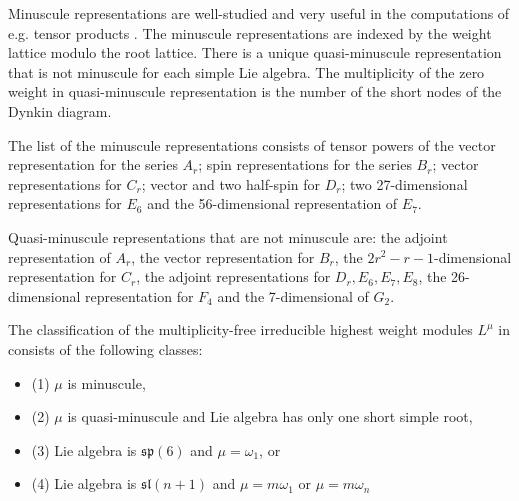 \documentclass[12pt]{iopart}
\begin{document}
Minuscule representations are well-studied and very useful in the computations of e.g. tensor products
\cite{stembridge2003multiplicity,stembridge2001computational}. The minuscule representations are
indexed by the weight lattice modulo the root lattice. There is a unique quasi-minuscule
representation that is not minuscule for each simple Lie algebra. The multiplicity of the zero 
weight in quasi-minuscule representation is the number of the short nodes of the Dynkin diagram.

The list of the minuscule representations consists of tensor powers of the vector
representation for the series $A_{r}$; spin representations for the series
$B_{r}$; vector representations for $C_{r}$; vector and two half-spin for $D_{r}$; two
27-dimensional representations for $E_{6}$ and the 56-dimensional representation of $E_{7}$. 

Quasi-minuscule representations that are not minuscule are: the adjoint representation of $A_{r}$,
the vector representation for $B_{r}$, the $2r^{2}-r-1$-dimensional representation for $C_{r}$, the adjoint
representations for $D_{r}, E_{6}, E_{7}, E_{8}$, the 26-dimensional representation for $F_{4}$ and
the 7-dimensional of $G_{2}$.


The classification of the multiplicity-free irreducible highest weight modules $L^{\mu}$ in
\cite{howe1995perspectives,stembridge2003multiplicity} consists of the following classes:
\begin{itemize}
\item (1) $\mu$ is minuscule,
\item (2) $\mu$ is quasi-minuscule and Lie algebra has only one short simple root,
\item (3) Lie algebra is $\mathfrak{sp}(6)$ and $\mu=\omega_{1}$, or
\item (4) Lie algebra is $\mathfrak{sl}(n + 1)$ and  $\mu= m\omega_{1}$ or $\mu  = m\omega_{n}$ 
\end{itemize}
\end{document}
